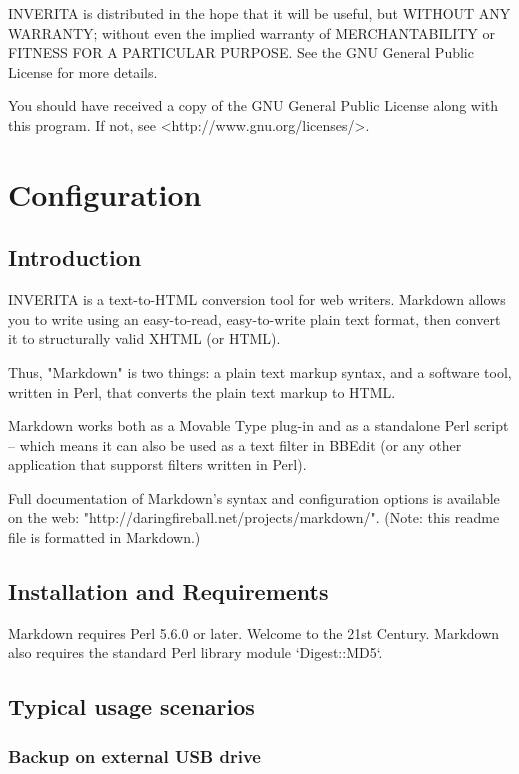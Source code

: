 INVERITA is distributed in the hope that it will be useful,
but WITHOUT ANY WARRANTY; without even the implied warranty of
MERCHANTABILITY or FITNESS FOR A PARTICULAR PURPOSE.  See the
GNU General Public License for more details.

You should have received a copy of the GNU General Public License
along with this program.  If not, see <http://www.gnu.org/licenses/>.



\chapter{Configuration}

\section{Introduction}
INVERITA is a text-to-HTML conversion tool for web writers. Markdown
allows you to write using an easy-to-read, easy-to-write plain text
format, then convert it to structurally valid XHTML (or HTML).

Thus, "Markdown" is two things: a plain text markup syntax, and a
software tool, written in Perl, that converts the plain text markup 
to HTML.

Markdown works both as a Movable Type plug-in and as a standalone Perl
script -- which means it can also be used as a text filter in BBEdit
(or any other application that supporst filters written in Perl).

Full documentation of Markdown's syntax and configuration options is
available on the web: "http://daringfireball.net/projects/markdown/".
(Note: this readme file is formatted in Markdown.)



\section{Installation and Requirements}

Markdown requires Perl 5.6.0 or later. Welcome to the 21st Century.
Markdown also requires the standard Perl library module `Digest::MD5`. 


\section{Typical usage scenarios}

\subsection{Backup on external USB drive}

